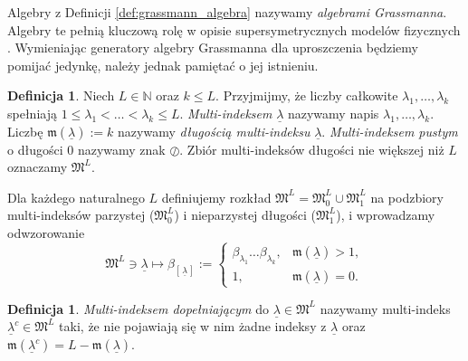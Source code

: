 \documentclass[11pt,a4paper]{report}
\theoremstyle{definition}
\newtheorem{definition}[theorem]{Definicja}
\begin{document}
Algebry z Definicji \ref{def:grassmann_algebra} nazywamy \textit{algebrami Grassmanna}. Algebry te pełnią kluczową rolę w opisie supersymetrycznych modelów fizycznych \cite{rogers}. Wymieniając generatory algebry Grassmanna dla uproszczenia będziemy pomijać jedynkę, należy jednak pamiętać o jej istnieniu.
\begin{definition}
Niech $L \in \mathbb{N}$ oraz $k \leq L$. Przyjmijmy, że liczby całkowite $\lambda_1, \ldots, \lambda_k$ spełniają $1 \leq \lambda_1 < \ldots < \lambda_k \leq L$. \textit{Multi-indeksem} $\underline{\lambda}$ nazywamy napis $\lambda_1, \ldots, \lambda_k$. Liczbę $\mathfrak{m}\! \left( \underline{\lambda} \right) := k$ nazywamy \textit{długością multi-indeksu} $\underline{\lambda}$. \textit{Multi-indeksem pustym} o długości 0 nazywamy znak $\oslash$. Zbiór multi-indeksów długości nie większej niż $L$ oznaczamy $\mathfrak{M}^L$.
\label{mindex}
\end{definition}
Dla każdego naturalnego $L$ definiujemy rozkład $\mathfrak{M}^L = \mathfrak{M}^L_0 \cup \mathfrak{M}^L_1$ na podzbiory multi-indeksów parzystej ($\mathfrak{M}^L_{0}$) i nieparzystej długości ($\mathfrak{M}^L_{1}$), i wprowadzamy odwzorowanie
\begin{equation*}
 \mathfrak{M}^L \ni \underline{\lambda} \mapsto \beta_{\left[\, \underline{\lambda}\, \right]} := \left\{ \begin{array}{lr}
                     \beta_{\lambda_1} \ldots \beta_{\lambda_k}, & \mathfrak{m}(\underline{\lambda}) > 1, \\
		     1, & \mathfrak{m}(\underline{\lambda}) = 0.  
                     \end{array} \right.
\end{equation*}

\begin{definition}
\textit{Multi-indeksem dopełniającym} do $\underline{\lambda} \in \mathfrak{M}^L$ nazywamy multi-indeks $\underline{\lambda}^c \in \mathfrak{M}^L$ taki, że nie pojawiają się w nim żadne indeksy z $\underline{\lambda}$ oraz $\mathfrak{m}(\underline{\lambda}^c) = L - \mathfrak{m}(\underline{\lambda})$.
\end{definition}
\end{document}

